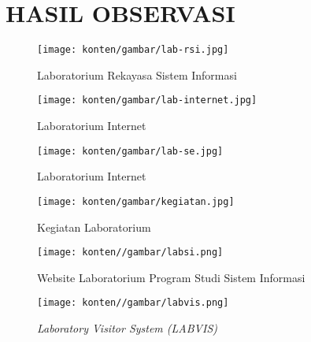 %
%
%
%


\renewcommand{\thepage}{B - \arabic{page}}
\chapter{HASIL OBSERVASI}
\begin{figure}
	\centering
	\texttt{[image: konten/gambar/lab-rsi.jpg]}
	\caption{Laboratorium Rekayasa Sistem Informasi \protect\cite{labsi2023}}
	\label{fig:lab-rsi}
\end{figure}

\begin{figure}
	\centering
	\texttt{[image: konten/gambar/lab-internet.jpg]}
	\caption{Laboratorium Internet \protect\cite{labsi2023}}
	\label{fig:lab-int}
\end{figure}

\begin{figure}
	\centering
	\texttt{[image: konten/gambar/lab-se.jpg]}
	\caption{Laboratorium Internet \protect\cite{labsi2023}}
	\label{fig:lab-int}
\end{figure}

\begin{figure}
	\centering
	\texttt{[image: konten/gambar/kegiatan.jpg]}
	\caption{Kegiatan Laboratorium} \protect\cite{labsi2023}
	\label{fig:lab-se}
\end{figure}

\begin{figure}
	\centering
	\texttt{[image: konten//gambar/labsi.png]}
	\caption{Website Laboratorium Program Studi Sistem Informasi \protect\cite{web-prodi}}
	\label{fig:enter-label}
\end{figure}

\begin{figure}
	\centering
	\texttt{[image: konten//gambar/labvis.png]}
	\caption{\textit{Laboratory Visitor System (LABVIS)} \protect\cite{web-prodi}}
	\label{fig:enter-label}
\end{figure}


